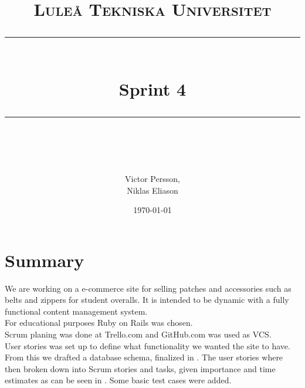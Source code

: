 \documentclass[paper=a4, fontsize=11pt]{report} %
\newcommand{\horrule}[1]{\rule{\linewidth}{#1}}       %
\begin{document}
%
\title{
	\normalfont \normalsize
	\textsc{Luleå Tekniska Universitet} \\ [25pt] %
	\horrule{1pt} \\[0.4cm]                       %
	\huge Sprint 4 \\                             %
	\horrule{1pt} \\[0.5cm]                       %
}
%
\author{Victor Persson,\\ Niklas Eliason}             %
%
\date{\normalsize\today}                              %
%
\maketitle                                            %
%
\tableofcontents
\thispagestyle{empty}
\sectionfont{\scshape}
%
\newpage
\setcounter{page}{1}


\section*{Summary}
	We are working on a e-commerce site for selling patches and accessories such as
	belts and zippers for student overalls. It is intended to be dynamic with a
	fully functional content management system. \\
	For educational purposes Ruby on Rails was chosen. \\
	Scrum planing was done at Trello.com and GitHub.com was used as VCS. \\

	User stories was set up
	 to define what functionality we wanted the site to have. From this we drafted a
	database schema, finalized in
	 . The user stories where then broken down into Scrum stories and tasks, given
	importance and time estimates as can be seen in
	 . Some basic test cases
	were added.

\end{document}
